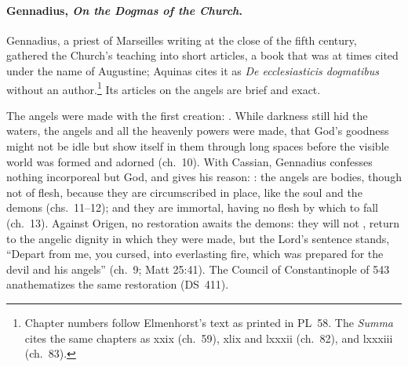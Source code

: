 \paragraph{Gennadius, \emph{On the Dogmas of the Church}.} Gennadius, a
priest of Marseilles writing at the close of the fifth century, gathered
the Church's teaching into short articles, a book that was at times cited
under the name of Augustine; Aquinas cites it as \emph{De ecclesiasticis
dogmatibus} without an author.\footnote{Chapter numbers follow
Elmenhorst's text as printed in PL~58. The \emph{Summa} cites the same
chapters as xxix (ch.~59), xlix and lxxxii (ch.~82), and lxxxiii
(ch.~83).} Its articles on the angels are brief and exact.

The angels were made with the first creation: . While darkness
still hid the waters, the angels and all the heavenly powers were made,
that God's goodness might not be idle but show itself in them through
long spaces before the visible world was formed and adorned (ch.~10).
With Cassian, Gennadius
confesses nothing incorporeal but God, and gives his reason:
: the angels
are bodies, though not of flesh, because they are circumscribed in place,
like the soul and the demons (chs.~11--12); and they are immortal, having
no flesh by which to fall (ch.~13). Against Origen, no restoration awaits the demons: they will
not , return to
the angelic dignity in which they were made, but the Lord's sentence stands, ``Depart
from me, you cursed, into everlasting fire, which was prepared for the
devil and his angels'' (ch.~9; Matt 25:41). The Council of Constantinople
of 543 anathematizes the same restoration (DS~411).

